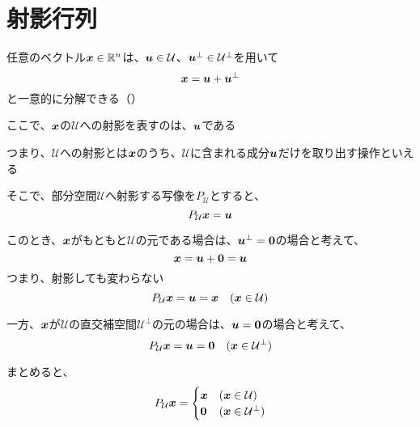 \documentclass[../../../topic_linear-algebra]{subfiles}
\begin{document}
\sectionline
\section{射影行列}

任意のベクトル$\vb*{x} \in \mathbb{R}^n$は、$\vb*{u} \in \mathcal{U}$、$\vb*{u}^\perp \in \mathcal{U}^\perp$を用いて
\begin{equation*}
  \vb*{x} = \vb*{u} + \vb*{u}^\perp
\end{equation*}
と一意的に分解できる（）

\br

ここで、$\vb*{x}$の$\mathcal{U}$への射影を表すのは、$\vb*{u}$である

つまり、$\mathcal{U}$への射影とは$\vb*{x}$のうち、$\mathcal{U}$に含まれる成分$\vb*{u}$だけを取り出す操作といえる

そこで、部分空間$\mathcal{U}$へ射影する写像を$P_{\mathcal{U}}$とすると、
\begin{equation*}
  P_{\mathcal{U}}\vb*{x} = \vb*{u}
\end{equation*}

\br

このとき、$\vb*{x}$がもともと$\mathcal{U}$の元である場合は、$\vb*{u}^\perp = \vb*{0}$の場合と考えて、
\begin{equation*}
  \vb*{x} = \vb*{u} + \vb*{0} = \vb*{u}
\end{equation*}
つまり、射影しても変わらない
\begin{equation*}
  P_{\mathcal{U}}\vb*{x} = \vb*{u} = \vb*{x} \quad (\vb*{x} \in \mathcal{U})
\end{equation*}

\br

一方、$\vb*{x}$が$\mathcal{U}$の直交補空間$\mathcal{U}^{\perp}$の元の場合は、$\vb*{u} = \vb*{0}$の場合と考えて、
\begin{equation*}
  P_{\mathcal{U}}\vb*{x} = \vb*{u} = \vb*{0} \quad (\vb*{x} \in \mathcal{U}^{\perp})
\end{equation*}

\br

まとめると、
\begin{equation*}
  P_{\mathcal{U}}\vb*{x} = \begin{cases}
    \vb*{x} & (\vb*{x} \in \mathcal{U})         \\
    \vb*{0} & (\vb*{x} \in \mathcal{U}^{\perp})
  \end{cases}
\end{equation*}
\end{document}

